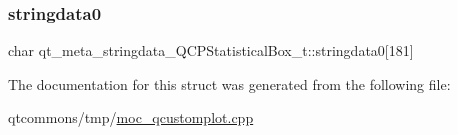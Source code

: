 \subsubsection{\texorpdfstring{stringdata0}{stringdata0}}
{\footnotesize\ttfamily char qt\+\_\+meta\+\_\+stringdata\+\_\+\+Q\+C\+P\+Statistical\+Box\+\_\+t\+::stringdata0\mbox{[}181\mbox{]}}



The documentation for this struct was generated from the following file\+:\begin{DoxyCompactItemize}
\item 
qtcommons/tmp/\mbox{\hyperlink{moc__qcustomplot_8cpp}{moc\+\_\+qcustomplot.\+cpp}}\end{DoxyCompactItemize}
